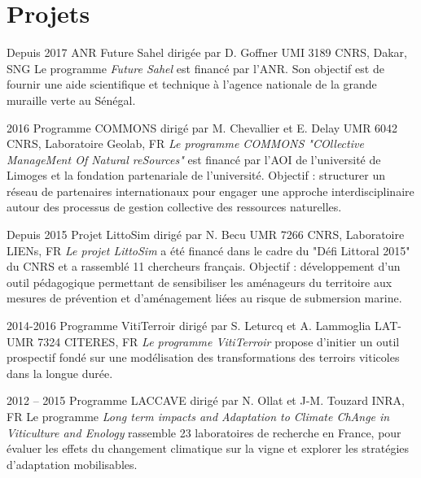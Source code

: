 \documentclass[]{cv-etienne}
\begin{document}
\section{Projets}
\begin{entrylist}
\entry
{Depuis 2017}
{ANR Future Sahel {\normalfont dirigée par D. Goffner}}
{UMI 3189 CNRS, Dakar, SNG}
{Le programme \emph{Future Sahel} est financé par l'ANR. Son objectif est de fournir une aide scientifique et technique à l'agence nationale de la grande muraille verte au Sénégal.}
\end{entrylist}
\begin{entrylist}
\entry
{2016}
{Programme COMMONS {\normalfont dirigé par M. Chevallier et E. Delay}}
{UMR 6042 CNRS, Laboratoire Geolab, FR}
{\emph{Le programme COMMONS "\textit{COllective ManageMent Of Natural reSources}"} est financé par l'AOI de l'université de Limoges et la fondation partenariale de l'université. Objectif : structurer un réseau de partenaires internationaux pour engager une approche interdisciplinaire autour des processus de gestion collective des ressources naturelles.}
\end{entrylist}
\begin{entrylist}
\entry
{Depuis 2015}
{Projet LittoSim {\normalfont dirigé par N. Becu}}
{UMR 7266 CNRS, Laboratoire LIENs, FR}
{\emph{Le projet LittoSim} a été financé dans le cadre du "Défi Littoral 2015" du CNRS et a rassemblé 11 chercheurs français. Objectif : développement d'un outil pédagogique permettant de sensibiliser les aménageurs du territoire aux mesures de prévention et d'aménagement liées au risque de submersion marine.}
\end{entrylist}
\begin{entrylist}
\entry
{2014-2016}
{Programme VitiTerroir {\normalfont dirigé par S. Leturcq et A. Lammoglia}}
{LAT-UMR 7324 CITERES, FR}
{\emph{Le programme VitiTerroir} propose d'initier un outil prospectif fondé sur une modélisation des transformations des terroirs viticoles dans la longue durée.}
\end{entrylist}
\begin{entrylist}
\entry
{2012 -- 2015}
{Programme LACCAVE {\normalfont dirigé par N. Ollat et J-M. Touzard}}
{INRA, FR}
{Le programme \emph{Long term impacts and Adaptation to Climate ChAnge in Viticulture and Enology} rassemble 23 laboratoires de recherche en France, pour évaluer les effets du changement climatique sur la vigne et explorer les stratégies d'adaptation mobilisables.}
\end{entrylist}
\end{document}
